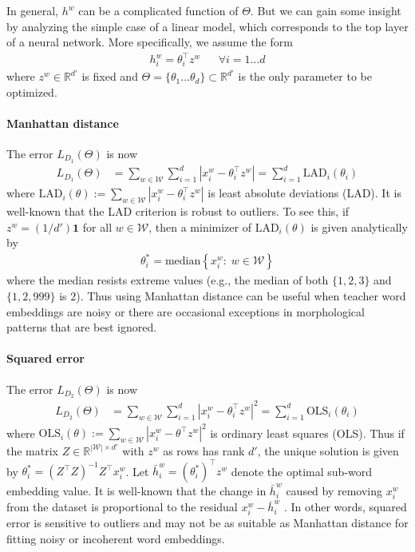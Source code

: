 \documentclass[11pt,letterpaper,UTF8]{article}
\newcommand{\R}{\ensuremath{\mathbb{R}}}
\newcommand{\myset}[1]{\left\{#1\right\}}
\newcommand{\paren}[1]{\left(#1\right)}
\newcommand{\abs}[1]{\left|#1\right|}
\newcommand{\by}{\ensuremath{\times}}
\begin{document}
\begin{CJK}{UTF8}{gbsn}
In general, $h^w$ can be a complicated function of $\Theta$.
But we can gain some insight by analyzing the simple case of a linear model, which corresponds to the top layer of a neural network.
More specifically, we assume the form
\begin{align*}
h^w_i = \theta_i^\top z^w &&\forall i = 1 \ldots d
\end{align*}
where $z^w \in \R^{d'}$ is fixed and $\Theta = \{\theta_1 \ldots \theta_d\} \subset \R^{d'}$ is the only parameter to be optimized.

\paragraph{Manhattan distance}
The error $L_{D_1}(\Theta)$ is now
\begin{align*}
L_{D_1}(\Theta) &= \sum_{w \in \mathcal{W}} \sum_{i=1}^d \abs{x^w_i - \theta_i^\top z^w} = \sum_{i=1}^d \mbox{LAD}_i(\theta_i)
\end{align*}
where $\mbox{LAD}_i(\theta) := \sum_{w \in \mathcal{W}} \abs{x^w_i - \theta_i^\top z^w}$ is least absolute deviations (LAD).
It is well-known that the LAD criterion is robust to outliers.
To see this, if $z^w =(1/d') \textbf{1}$ for all $w \in \mathcal{W}$, then a minimizer of $\mbox{LAD}_i(\theta)$ is given analytically by
\begin{align*}
\theta_i^* = \mbox{median} \myset{x^w_i:\; w \in \mathcal{W}}
\end{align*}
where the median resists extreme values (e.g., the median of both $\{1, 2, 3\}$ and $\{1, 2, 999\}$ is $2$).
Thus using Manhattan distance can be useful when teacher word embeddings are noisy
or there are occasional exceptions in morphological patterns that are best ignored.

\paragraph{Squared error}
The error $L_{D_2}(\Theta)$ is now
\begin{align*}
L_{D_2}(\Theta) &= \sum_{w \in \mathcal{W}} \sum_{i=1}^d  \abs{x^{w}_i - \theta_i^\top z^w}^2 = \sum_{i=1}^d  \mbox{OLS}_i(\theta_i)
\end{align*}
where $\mbox{OLS}_i(\theta) := \sum_{w \in \mathcal{W}} \abs{x^w_i - \theta^\top z^w}^2$ is ordinary least squares (OLS).
Thus if the matrix $Z \in \R^{\abs{\mathcal{W}} \by d'}$ with $z^w$ as rows has rank $d'$, the unique solution is given by
$\theta_i^* = \paren{Z^\top Z}^{-1} Z^\top x^w_i$.
Let $\bar{h}^w_i = (\theta_i^*)^\top z^w$ denote the optimal sub-word embedding value.
It is well-known that the change in $\bar{h}^w_i$ caused by removing $x^w_i$ from the dataset is proportional to
the residual $x^w_i - \bar{h}^w_i$ \cite{davidson1993estimation}.
In other words, squared error is sensitive to outliers and may not be as suitable as Manhattan distance for fitting noisy
or incoherent word embeddings.


\end{CJK}
\end{document}
